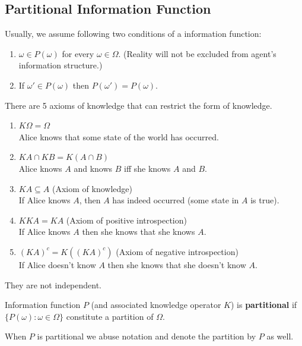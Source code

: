 \documentclass[11pt]{elegantbook_2}
\begin{document}
\subsection{Partitional Information Function}
\begin{definition}
    Usually, we assume following two conditions of a information function:
    \begin{enumerate}[P1.]
        \item $\omega\in P(\omega)$ for every $\omega\in\Omega$. (Reality will not be excluded from agent's information structure.)
        \item If $\omega'\in P(\omega)$ then $P(\omega')=P(\omega)$.
    \end{enumerate}
\end{definition}

\begin{definition}
    There are 5 axioms of knowledge that can restrict the form of knowledge.
    \begin{enumerate}
        \item $K \Omega=\Omega$\\ Alice knows that some state of the world has occurred.
        \item $K A \cap K B=K(A \cap B)$\\ Alice knows $A$ and knows $B$ iff she knows $A$ and $B$.
        \item $K A \subseteq A$ (Axiom of knowledge)\\ If Alice knows $A$, then $A$ has indeed occurred (some state in $A$ is true).
        \item $K K A=K A$ (Axiom of positive introspection)\\ If Alice knows $A$ then she knows that she knows $A$.
        \item $(K A)^c=K\left((K A)^c\right)$ (Axiom of negative introspection)\\ If Alice doesn't know $A$ then she knows that she doesn't know $A$.
    \end{enumerate}
    They are not independent.
\end{definition}

\begin{definition}[Partitional]
    Information function $P$ (and associated knowledge operator $K$) is \textbf{partitional}
    if $\{P(\omega) : \omega \in \Omega\}$ constitute a partition of $\Omega$.
\end{definition}
When $P$ is partitional we abuse notation and denote the partition by $P$ as well.
\end{document}
